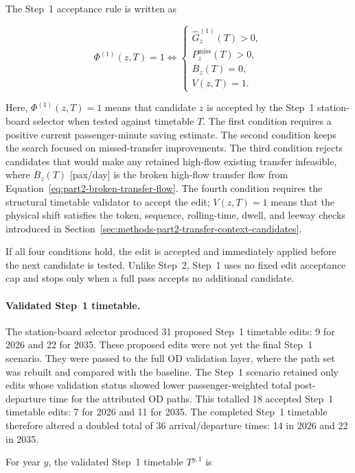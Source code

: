 \documentclass[preprint,12pt]{elsarticle}
\begin{document}
The Step~1 acceptance rule is written as

\begin{equation}
\Phi^{(1)}(z,T)=1
\Longleftrightarrow
\begin{cases}
\widehat G_z^{(1)}(T)>0,\\
P^{\mathrm{miss}}_z(T)>0,\\
B_z(T)=0,\\
V(z,T)=1.
\end{cases}
\label{eq:part2-step1-greedy}
\end{equation}

Here, \(\Phi^{(1)}(z,T)=1\) means that candidate \(z\) is accepted by the Step~1 station-board selector when tested against timetable \(T\). The first condition requires a positive current passenger-minute saving estimate. The second condition keeps the search focused on missed-transfer improvements. The third condition rejects candidates that would make any retained high-flow existing transfer infeasible, where \(B_z(T)\) [pax/day] is the broken high-flow transfer flow from Equation~\eqref{eq:part2-broken-transfer-flow}. The fourth condition requires the structural timetable validator to accept the edit; \(V(z,T)=1\) means that the physical shift satisfies the token, sequence, rolling-time, dwell, and leeway checks introduced in Section~\ref{sec:methods-part2-transfer-context-candidates}.

If all four conditions hold, the edit is accepted and immediately applied before the next candidate is tested. Unlike Step~2, Step~1 uses no fixed edit acceptance cap and stops only when a full pass accepts no additional candidate.
\paragraph*{Validated Step~1 timetable.}
The station-board selector produced 31 proposed Step~1 timetable edits: 9 for 2026 and 22 for 2035. These proposed edits were not yet the final Step~1 scenario. They were passed to the full OD validation layer, where the path set was rebuilt and compared with the baseline. The Step~1 scenario retained only edits whose validation status showed lower passenger-weighted total post-departure time for the attributed OD paths. This totalled 18 accepted Step~1 timetable edits: 7 for 2026 and 11 for 2035. The completed Step~1 timetable therefore altered a doubled total of 36 arrival/departure times: 14 in 2026 and 22 in 2035.

For year \(y\), the validated Step~1 timetable \(T^{y,1}\) is
\end{document}
